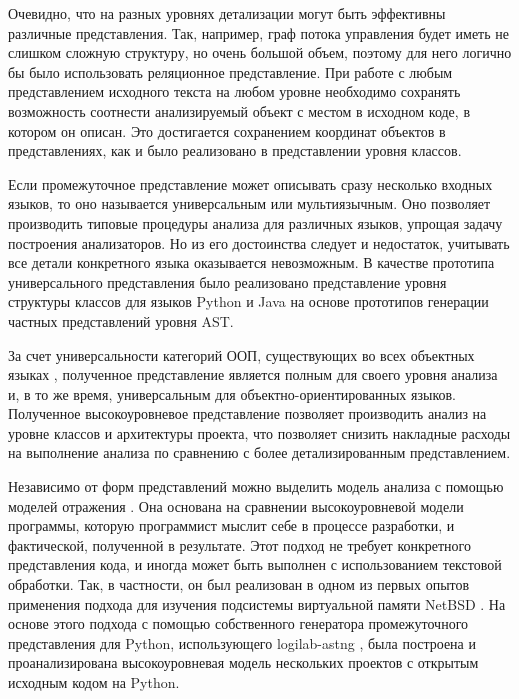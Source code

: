 \documentclass[10pt, a5paper]{article}
\begin{document}
Очевидно, что на разных уровнях детализации могут быть эффективны различные представления. Так, например, граф потока управления будет иметь не слишком сложную структуру, но очень большой объем, поэтому для него логично бы было использовать реляционное представление. При работе с любым представлением исходного текста на любом уровне необходимо сохранять возможность соотнести анализируемый объект с местом в исходном коде, в котором он описан. Это достигается сохранением координат объектов в представлениях, как и было реализовано в представлении уровня классов.

Если промежуточное представление может описывать сразу \linebreak несколько входных языков, то оно называется универсальным или мультиязычным. Оно позволяет производить типовые процедуры анализа для различных языков, упрощая задачу построения анализаторов. Но из его достоинства следует и недостаток, учитывать все детали конкретного языка оказывается невозможным. В качестве прототипа универсального представления было реализовано представление уровня структуры классов для языков Python и Java на основе прототипов генерации частных представлений уровня AST.

За счет универсальности категорий ООП, существующих во всех объектных языках \cite{Zubov18}, полученное представление является полным для своего уровня анализа и, в то же время, универсальным для объектно-ориентированных языков. Полученное высокоуровневое представление позволяет производить анализ на уровне классов и архитектуры проекта, что позволяет снизить накладные расходы на выполнение анализа по сравнению с более детализированным представлением.

Независимо от форм представлений можно выделить модель анализа с помощью моделей отражения \cite{Zubov19}. Она основана на сравнении высокоуровневой модели программы, которую программист мыслит себе в процессе разработки, и фактической, полученной в результате. Этот подход не требует конкретного представления кода, и иногда может быть выполнен с использованием текстовой обработки. Так, в частности, он был реализован в одном из первых опытов применения подхода для изучения подсистемы виртуальной памяти NetBSD \cite{Zubov19}. На основе этого подхода с помощью собственного генератора промежуточного представления для Python, использующего logilab-astng \cite{Zubov7}, была построена и проанализирована высокоуровневая модель нескольких проектов с открытым исходным кодом на Python.
\end{document}
